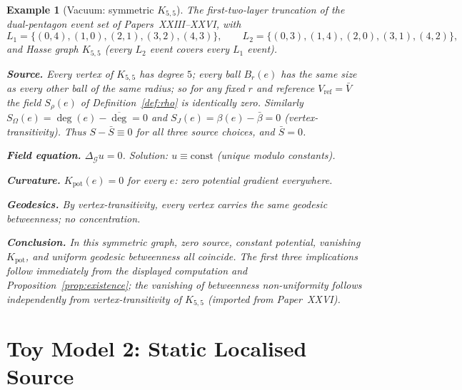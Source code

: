 \documentclass[12pt]{article}
\newtheorem{example}[theorem]{Example}
\newcommand{\Gcal}{\mathcal{G}}
\begin{document}
\begin{example}[Vacuum: symmetric $K_{5,5}$]\label{ex:vacuum}
The first-two-layer truncation of the dual-pentagon event set of Papers~XXIII--XXVI, with
\[
    L_1 = \{(0,4),(1,0),(2,1),(3,2),(4,3)\}, \qquad L_2 = \{(0,3),(1,4),(2,0),(3,1),(4,2)\},
\]
and Hasse graph $K_{5,5}$ (every $L_2$ event covers every $L_1$ event).

\textbf{Source.} Every vertex of $K_{5,5}$ has degree $5$; every ball $B_r(e)$ has the same size as every other ball of the same radius; so for any fixed $r$ and reference $V_{\mathrm{ref}} = \bar V$ the field $S_\rho(e)$ of Definition~\ref{def:rho} is identically zero. Similarly $S_\Omega(e) = \deg(e) - \overline{\deg} = 0$ and $S_J(e) = \beta(e) - \bar\beta = 0$ (vertex-transitivity). Thus $S - \bar S \equiv 0$ for all three source choices, and $\bar S = 0$.

\textbf{Field equation.} $\Delta_\Gcal u = 0$. Solution: $u \equiv \mathrm{const}$ (unique modulo constants).

\textbf{Curvature.} $K_{\mathrm{pot}}(e) = 0$ for every $e$: zero potential gradient everywhere.

\textbf{Geodesics.} By vertex-transitivity, every vertex carries the same geodesic betweenness; no concentration.

\textbf{Conclusion.} In this symmetric graph, zero source, constant potential, vanishing $K_{\mathrm{pot}}$, and uniform geodesic betweenness all coincide. The first three implications follow immediately from the displayed computation and Proposition~\ref{prop:existence}; the vanishing of betweenness non-uniformity follows independently from vertex-transitivity of $K_{5,5}$ (imported from Paper~XXVI).
\end{example}

\section{Toy Model 2: Static Localised Source}\label{sec:static}
\end{document}
